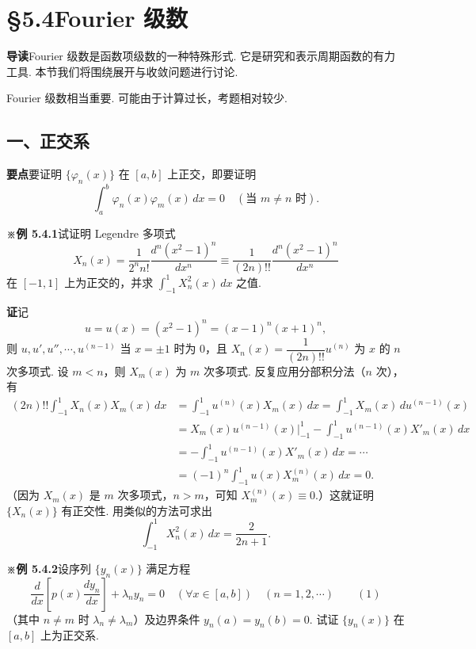 \documentclass[UTF8, 12pt, fontset=fandol, oneside]{ctexart}
\begin{document}
\section*{§5.4\quad Fourier 级数}

\noindent\textbf{导读}\quad Fourier 级数是函数项级数的一种特殊形式. 它是研究和表示周期函数的有力工具. 本节我们将围绕展开与收敛问题进行讨论.

Fourier 级数相当重要. 可能由于计算过长，考题相对较少.

\subsection*{一、正交系}

\noindent\textbf{要点}\quad 要证明 $\{\varphi_n(x)\}$ 在 $[a,b]$ 上正交，即要证明
\[
  \int_a^b \varphi_n(x)\varphi_m(x)\,dx=0\quad(\text{当 }m\ne n\text{ 时}).
\]

\noindent\textbf{※例 5.4.1}\quad 试证明 Legendre 多项式
\[
  X_n(x)=\frac1{2^nn!}\frac{d^n(x^2-1)^n}{dx^n}
  \equiv\frac1{(2n)!!}\frac{d^n(x^2-1)^n}{dx^n}
\]
在 $[-1,1]$ 上为正交的，并求 $\displaystyle\int_{-1}^1X_n^2(x)\,dx$ 之值.

\noindent\textbf{证}\quad 记
\[
  u=u(x)=(x^2-1)^n=(x-1)^n(x+1)^n,
\]
则 $u,u',u'',\cdots,u^{(n-1)}$ 当 $x=\pm1$ 时为 0，且 $X_n(x)=\dfrac1{(2n)!!}u^{(n)}$ 为 $x$ 的 $n$ 次多项式. 设 $m<n$，则 $X_m(x)$ 为 $m$ 次多项式. 反复应用分部积分法（$n$ 次），有
\[
\begin{aligned}
(2n)!!\int_{-1}^1X_n(x)X_m(x)\,dx
&=\int_{-1}^1u^{(n)}(x)X_m(x)\,dx
=\int_{-1}^1X_m(x)\,du^{(n-1)}(x)\\
&=X_m(x)u^{(n-1)}(x)\bigg|_{-1}^1
-\int_{-1}^1u^{(n-1)}(x)X'_m(x)\,dx\\
&=-\int_{-1}^1u^{(n-1)}(x)X'_m(x)\,dx
=\cdots\\
&=(-1)^n\int_{-1}^1u(x)X_m^{(n)}(x)\,dx=0.
\end{aligned}
\]
（因为 $X_m(x)$ 是 $m$ 次多项式，$n>m$，可知 $X_m^{(n)}(x)\equiv0$.）这就证明 $\{X_n(x)\}$ 有正交性. 用类似的方法可求出
\[
  \int_{-1}^1X_n^2(x)\,dx=\frac2{2n+1}.
\]

\noindent\textbf{※例 5.4.2}\quad 设序列 $\{y_n(x)\}$ 满足方程
\[
  \frac d{dx}\left[p(x)\frac{dy_n}{dx}\right]+\lambda_ny_n=0\quad
  (\forall x\in[a,b])\quad(n=1,2,\cdots) \qquad(1)
\]
（其中 $n\ne m$ 时 $\lambda_n\ne\lambda_m$）及边界条件 $y_n(a)=y_n(b)=0$. 试证 $\{y_n(x)\}$ 在 $[a,b]$ 上为正交系.
\end{document}
